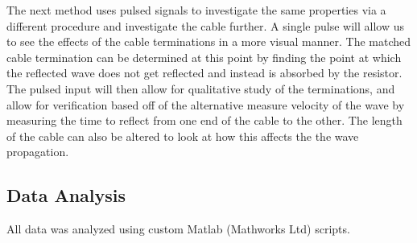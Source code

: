 The next method uses pulsed signals to investigate the same properties via a different procedure and investigate the cable further. A single pulse will allow us to see the effects of the cable terminations in a more visual manner. The matched cable termination can be determined at this point by finding the point at which the reflected wave does not get reflected and instead is absorbed by the resistor. The pulsed input will then allow for qualitative study of the terminations, and allow for verification based off of the alternative measure velocity of the wave by measuring the time to reflect from one end of the cable to the other. The length of the cable can also be altered to look at how this affects the the wave propagation. 

\subsection{Data Analysis}
All data was analyzed using custom Matlab (Mathworks Ltd) scripts.\\